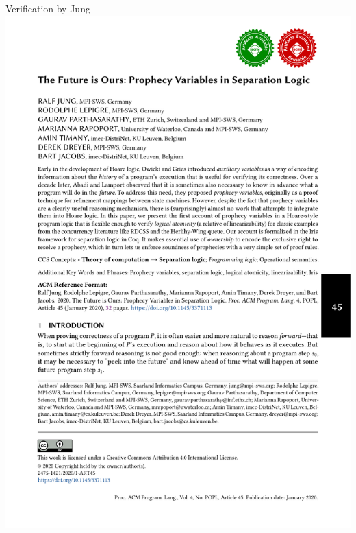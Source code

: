 \begin{frame}{Verification by Jung \etal}
\centering
\includegraphics[scale=0.5]{images/jung_lepigre_parthasarathy_2020.pdf}
\end{frame}



